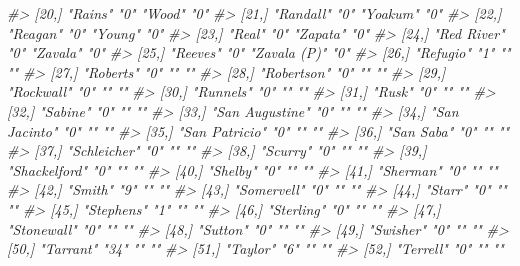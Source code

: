 \documentclass[
]{krantz}
\makeatletter
\newenvironment{Shaded}{\begin{snugshade}}{\end{snugshade}}
\newcommand{\CommentTok}[1]{\textcolor[rgb]{0.37,0.37,0.37}{\textit{#1}}}
\newenvironment{kframe}{%
\medskip{}
\setlength{\fboxsep}{.8em}
 \def\at@end@of@kframe{}%
 \ifinner\ifhmode%
  \def\at@end@of@kframe{\end{minipage}}%
  \begin{minipage}{\columnwidth}%
 \fi\fi%
 \def\FrameCommand##1{\hskip\@totalleftmargin \hskip-\fboxsep
 \colorbox{shadecolor}{##1}\hskip-\fboxsep
     \hskip-\linewidth \hskip-\@totalleftmargin \hskip\columnwidth}%
 \MakeFramed {\advance\hsize-\width
   \@totalleftmargin\z@ \linewidth\hsize
   \@setminipage}}%
 {\par\unskip\endMakeFramed%
 \at@end@of@kframe}
\renewenvironment{Shaded}{\begin{kframe}}{\end{kframe}}
\makeatother
\begin{document}
\begin{Shaded}
\begin{Highlighting}[]
\CommentTok{\#\textgreater{} [20,] "Rains"         "0"  "Wood"          "0"  }
\CommentTok{\#\textgreater{} [21,] "Randall"       "0"  "Yoakum"        "0"  }
\CommentTok{\#\textgreater{} [22,] "Reagan"        "0"  "Young"         "0"  }
\CommentTok{\#\textgreater{} [23,] "Real"          "0"  "Zapata"        "0"  }
\CommentTok{\#\textgreater{} [24,] "Red River"     "0"  "Zavala"        "0"  }
\CommentTok{\#\textgreater{} [25,] "Reeves"        "0"  "Zavala (P)"    "0"  }
\CommentTok{\#\textgreater{} [26,] "Refugio"       "1"  ""              ""   }
\CommentTok{\#\textgreater{} [27,] "Roberts"       "0"  ""              ""   }
\CommentTok{\#\textgreater{} [28,] "Robertson"     "0"  ""              ""   }
\CommentTok{\#\textgreater{} [29,] "Rockwall"      "0"  ""              ""   }
\CommentTok{\#\textgreater{} [30,] "Runnels"       "0"  ""              ""   }
\CommentTok{\#\textgreater{} [31,] "Rusk"          "0"  ""              ""   }
\CommentTok{\#\textgreater{} [32,] "Sabine"        "0"  ""              ""   }
\CommentTok{\#\textgreater{} [33,] "San Augustine" "0"  ""              ""   }
\CommentTok{\#\textgreater{} [34,] "San Jacinto"   "0"  ""              ""   }
\CommentTok{\#\textgreater{} [35,] "San Patricio"  "0"  ""              ""   }
\CommentTok{\#\textgreater{} [36,] "San Saba"      "0"  ""              ""   }
\CommentTok{\#\textgreater{} [37,] "Schleicher"    "0"  ""              ""   }
\CommentTok{\#\textgreater{} [38,] "Scurry"        "0"  ""              ""   }
\CommentTok{\#\textgreater{} [39,] "Shackelford"   "0"  ""              ""   }
\CommentTok{\#\textgreater{} [40,] "Shelby"        "0"  ""              ""   }
\CommentTok{\#\textgreater{} [41,] "Sherman"       "0"  ""              ""   }
\CommentTok{\#\textgreater{} [42,] "Smith"         "9"  ""              ""   }
\CommentTok{\#\textgreater{} [43,] "Somervell"     "0"  ""              ""   }
\CommentTok{\#\textgreater{} [44,] "Starr"         "0"  ""              ""   }
\CommentTok{\#\textgreater{} [45,] "Stephens"      "1"  ""              ""   }
\CommentTok{\#\textgreater{} [46,] "Sterling"      "0"  ""              ""   }
\CommentTok{\#\textgreater{} [47,] "Stonewall"     "0"  ""              ""   }
\CommentTok{\#\textgreater{} [48,] "Sutton"        "0"  ""              ""   }
\CommentTok{\#\textgreater{} [49,] "Swisher"       "0"  ""              ""   }
\CommentTok{\#\textgreater{} [50,] "Tarrant"       "34" ""              ""   }
\CommentTok{\#\textgreater{} [51,] "Taylor"        "6"  ""              ""   }
\CommentTok{\#\textgreater{} [52,] "Terrell"       "0"  ""              ""   }

\end{Highlighting}
\end{Shaded}
\end{document}
